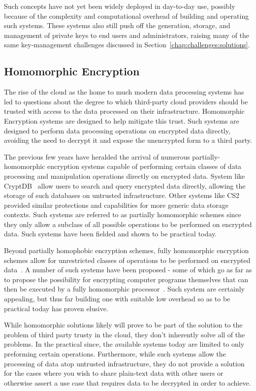 Such concepts have not yet been widely deployed in day-to-day use,
possibly because of the complexity and computational overhead of
building and operating such systems. These systems also still push off
the generation, storage, and management of private keys to end users
and administrators, raising many of the same key-management challenges
discussed in Section~\ref{chap:challenges:solutions}.

\subsection{Homomorphic Encryption}

The rise of the cloud as the home to much modern data processing
systems has led to questions about the degree to which third-party
cloud providers should be trusted with access to the data processed on
their infrastructure. Homomorphic Encryption systems are designed to
help mitigate this trust. Such systems are designed to perform data
processing operations on encrypted data directly, avoiding the need to
decrypt it and expose the unencrypted form to a third party.

The previous few years have heralded the arrival of numerous
partially-homomorphic encryption systems capable of performing certain
classes of data processing and manipulation operations directly on
encrypted data. System like CryptDB~\cite{popa2011} allow users to
search and query encrypted data directly, allowing the storage of such
databases on untrusted infrastructure. Other systems like
CS2~\cite{kamara2011} provided similar protections and capabilities
for more generic data storage contexts. Such systems are referred to
as partially homomorphic schemes since they only allow a subclass of
all possible operations to be performed on encrypted data. Such
systems have been fielded and shown to be practical today.

Beyond partially homophobic encryption schemes, fully homomorphic
encryption schemes allow for unrestricted classes of operations to be
performed on encrypted data~\cite{gentry2009}. A number of such
systems have been proposed - some of which go as far as to propose the
possibility for encrypting computer programs themselves that can then
be executed by a fully homomorphic processor~\cite{Breuer2013,
  Brenner2011}. Such system are certainly appealing, but thus far
building one with suitable low overhead so as to be practical today
has proven elusive.

While homomorphic solutions likely will prove to be part of the
solution to the problem of third party trusty in the cloud, they don't
inherently solve all of the problems. In the practical since, the
available systems today are limited to only preforming certain
operations. Furthermore, while such systems allow the processing of
data atop untrusted infrastructure, they do not provide a solution for
the cases where you wish to share plain-text data with other users or
otherwise assert a use case that requires data to be decrypted in
order to achieve.

